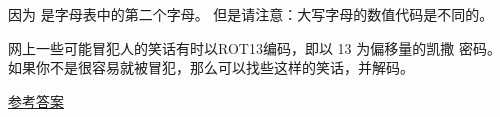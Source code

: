 \begin{exercise}
因为  是字母表中的第二个字母。 但是请注意：大写字母的数值代码是不同的。


网上一些可能冒犯人的笑话有时以ROT13编码，即以 13 为偏移量的凯撒
密码。 如果你不是很容易就被冒犯，那么可以找些这样的笑话，并解码。

\href{http://thinkpython2.com/code/rotate.py}{参考答案}

\end{exercise}